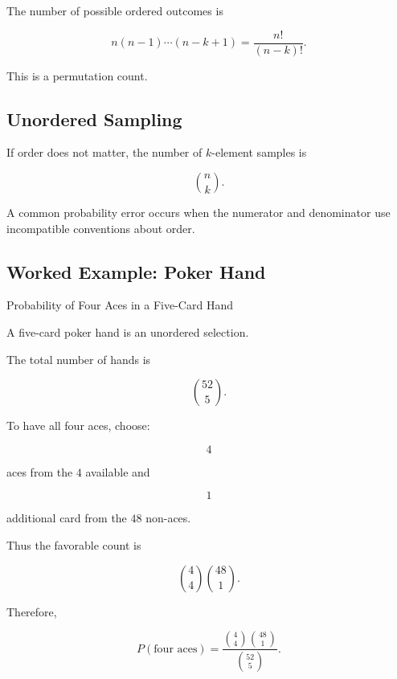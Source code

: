 The number of possible ordered outcomes is

\[
\boxed{
n(n-1)\cdots(n-k+1)
=
\frac{n!}{(n-k)!}.
}
\]

This is a permutation count.

\subsection{Unordered Sampling}
\label{subsec:unordered-sampling-probability}

If order does not matter, the number of \(k\)-element samples is

\[
\boxed{
\binom nk.
}
\]

A common probability error occurs when the numerator and denominator
use incompatible conventions about order.

\subsection{Worked Example: Poker Hand}
\label{subsec:worked-poker-hand}

\begin{workedexamplebox}{Probability of Four Aces in a Five-Card Hand}

A five-card poker hand is an unordered selection.

The total number of hands is

\[
\binom{52}{5}.
\]

To have all four aces, choose:

\[
4
\]

aces from the \(4\) available and

\[
1
\]

additional card from the \(48\) non-aces.

Thus the favorable count is

\[
\binom44\binom{48}{1}.
\]

Therefore,

\begin{answerbox}
\[
\boxed{
P(\text{four aces})
=
\frac{
\binom44\binom{48}{1}
}{
\binom{52}{5}
}.
}
\]
\end{answerbox}

\end{workedexamplebox}

